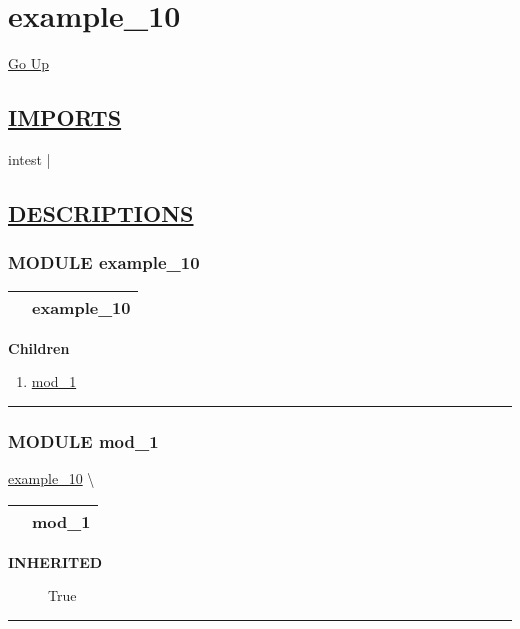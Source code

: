 \chapter*{\color{headfile}
example_10
}
\hypertarget{ecldoc:toc:example_10}{}
\hyperlink{ecldoc:toc:root}{Go Up}

\section*{\underline{\textsf{IMPORTS}}}
\begin{doublespace}
{\large
intest |
}
\end{doublespace}

\section*{\underline{\textsf{DESCRIPTIONS}}}
\subsection*{\textsf{\colorbox{headtoc}{\color{white} MODULE}
example\_10}}

\hypertarget{ecldoc:example_10}{}

{\renewcommand{\arraystretch}{1.5}
\begin{tabularx}{\textwidth}{|>{\raggedright\arraybackslash}l|X|}
\hline
\hspace{0pt}\mytexttt{\color{red} } & \textbf{example\_10} \\
\hline
\end{tabularx}
}

\par


\textbf{Children}
\begin{enumerate}
\item \hyperlink{ecldoc:intest.Example_3.mod_1}{mod\_1}
\end{enumerate}

\rule{\linewidth}{0.5pt}

\subsection*{\textsf{\colorbox{headtoc}{\color{white} MODULE}
mod\_1}}

\hypertarget{ecldoc:intest.Example_3.mod_1}{}
\hspace{0pt} \hyperlink{ecldoc:example_10}{example_10} \textbackslash 

{\renewcommand{\arraystretch}{1.5}
\begin{tabularx}{\textwidth}{|>{\raggedright\arraybackslash}l|X|}
\hline
\hspace{0pt}\mytexttt{\color{red} } & \textbf{mod\_1} \\
\hline
\end{tabularx}
}

\par

\par
\begin{description}
\item [\colorbox{tagtype}{\color{white} \textbf{\textsf{INHERITED}}}] \textbf{\underline{}} True
\end{description}

\rule{\linewidth}{0.5pt}


